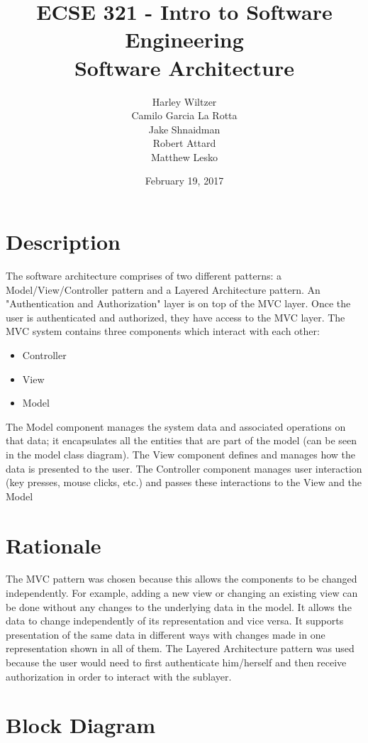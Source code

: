 \documentclass[12pt]{article}
\title{ECSE 321 - Intro to Software Engineering\\Software Architecture}
\author{Harley Wiltzer\\Camilo Garcia La Rotta\\Jake Shnaidman\\Robert Attard\\Matthew Lesko}
\date{February 19, 2017}
\begin{document}
\maketitle
\newpage
{} %
\tableofcontents
\section{Description}
	The software architecture comprises of two different patterns: a Model/View/Controller pattern and a Layered Architecture pattern. An "Authentication and Authorization" layer is on top of the MVC layer. Once the user is authenticated and authorized, they have access to the MVC layer. The MVC system contains three components which interact with each other: 
	\begin{itemize}
		\item Controller
		\item View
		\item Model
	\end{itemize}
	The Model component manages the system data and associated operations on that data; it encapsulates all the entities that are part of the model (can be seen in the model class diagram). The View component defines and manages how the data is presented to the user. The Controller component manages user interaction (key presses, mouse clicks, etc.) and passes these interactions to the View and the Model
\section{Rationale}
	The MVC pattern was chosen because this allows the components to be changed independently. For example, adding a new view or changing an existing view can be done without any changes to the underlying data in the model. It allows the data to change independently of its representation and vice versa. It supports presentation of the same data in different ways with changes made in one representation shown in all of them. 
	The Layered Architecture pattern was used because the user would need to first authenticate him/herself and then receive authorization in order to interact with the sublayer.
\section{Block Diagram}

\end{document}
